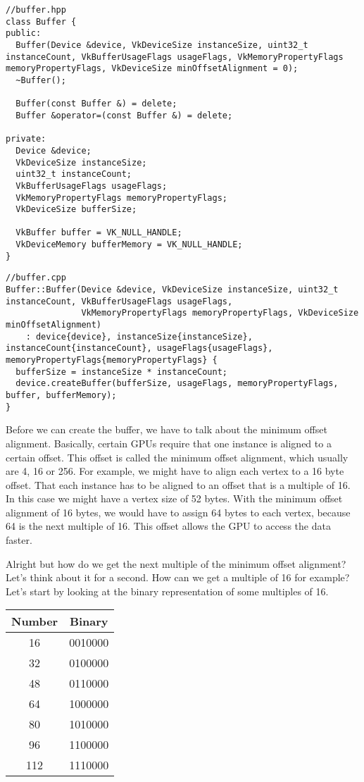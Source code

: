 \documentclass[12pt]{report} \usepackage{preamble}
\begin{document}
\begin{lstlisting}[Language=C++]
//buffer.hpp
class Buffer {
public:
  Buffer(Device &device, VkDeviceSize instanceSize, uint32_t instanceCount, VkBufferUsageFlags usageFlags, VkMemoryPropertyFlags memoryPropertyFlags, VkDeviceSize minOffsetAlignment = 0);
  ~Buffer();

  Buffer(const Buffer &) = delete;
  Buffer &operator=(const Buffer &) = delete;

private:
  Device &device;
  VkDeviceSize instanceSize;
  uint32_t instanceCount;
  VkBufferUsageFlags usageFlags;
  VkMemoryPropertyFlags memoryPropertyFlags;
  VkDeviceSize bufferSize;

  VkBuffer buffer = VK_NULL_HANDLE;
  VkDeviceMemory bufferMemory = VK_NULL_HANDLE;
}
\end{lstlisting}

\begin{lstlisting}[Language=C++]
//buffer.cpp
Buffer::Buffer(Device &device, VkDeviceSize instanceSize, uint32_t instanceCount, VkBufferUsageFlags usageFlags, 
               VkMemoryPropertyFlags memoryPropertyFlags, VkDeviceSize minOffsetAlignment) 
    : device{device}, instanceSize{instanceSize}, instanceCount{instanceCount}, usageFlags{usageFlags}, memoryPropertyFlags{memoryPropertyFlags} {
  bufferSize = instanceSize * instanceCount;
  device.createBuffer(bufferSize, usageFlags, memoryPropertyFlags, buffer, bufferMemory);
}
\end{lstlisting}

Before we can create the buffer, we have to talk about the minimum offset alignment. Basically, certain GPUs require that one instance is aligned to a certain offset.
This offset is called the minimum offset alignment, which usually are 4, 16 or 256. For example, we might have to align each vertex to a 16 byte offset. That each instance has to be aligned to an offset that is a multiple of 16.
In this case we might have a vertex size of 52 bytes. With the minimum offset alignment of 16 bytes, we would have to assign 64 bytes to each vertex, because 64 is the next multiple of 16.
This offset allows the GPU to access the data faster.

Alright but how do we get the next multiple of the minimum offset alignment? Let's think about it for a second.
How can we get a multiple of 16 for example? Let's start by looking at the binary representation of some multiples of 16.

\begin{table}[H]
	\centering
	\begin{tabular}{|c|c|}
		\hline
		Number & Binary  \\
		\hline
		16     & 0010000 \\
		32     & 0100000 \\
		48     & 0110000 \\
		64     & 1000000 \\
		80     & 1010000 \\
		96     & 1100000 \\
		112    & 1110000 \\
		\hline
	\end{tabular}
\end{table} \FloatBarrier
\end{document}
